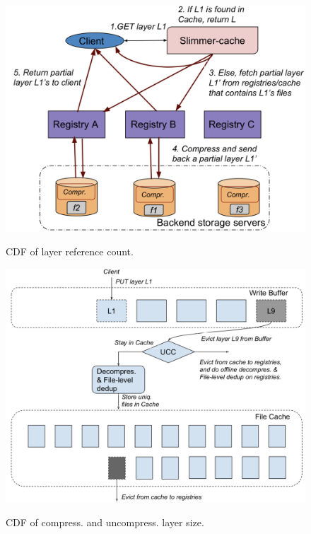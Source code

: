 \begin{figure}[t]
	\centering
		\begin{minipage}{0.225\textwidth}
			\centering
			\includegraphics[width=1\textwidth]{graphs/sys-architecture.png}
			\caption{CDF of layer reference count.}
			\label{fig:ref_count}
		\end{minipage}
	\begin{minipage}{0.225\textwidth}
		\centering
		\includegraphics[width=1\textwidth]{graphs/slimmer-cache.png}
		\caption{CDF of compress. and uncompress. layer size.}
		\vspace{-3pt}
		\label{fig:sys-overview}
	\end{minipage}
\end{figure}